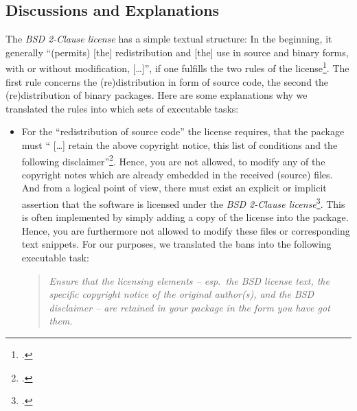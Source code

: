 \subsection{Discussions and Explanations}

The \textit{BSD 2-Clause license} has a simple textual structure: In the
beginning, it generally \enquote{(permits) [the] redistribution and [the] use in
source and binary forms, with or without modification, [\ldots]}, if one
fulfills the two rules of the license\footcite[cf.][\nopage
wp]{BsdLicense2Clause}. The first rule concerns the (re)distribution in form of
source code, the second the (re)distribution of binary packages. Here are some
explanations why we translated the rules into which sets of executable tasks:

\begin{itemize}
\item For the \enquote{redistribution of source code} the license requires,
that the package must \enquote{ [\ldots] retain the above copyright notice, this
list of conditions and the following disclaimer}\footcite[cf.][\nopage
wp]{BsdLicense2Clause}. Hence, you are not allowed, to modify any of the
copyright notes which are already embedded in the received (source) files. And
from a logical point of view, there must exist an explicit or implicit
assertion that the software is licensed under the \textit{BSD 2-Clause
license}\footcite[The BSD license requires that a re-distributed software
package must contain the (package specific) copyright notice, the (license
specific) conditions and the BSD disclaimer. (cf.][\nopage wp.) You might ask
what you should do, if these elements are missed in the package you got. If so,
the package you got had not been licensed adequately. Hence, you do not know
reliably whether you have received it under a BSD license. In other words: If
you have received a BSD licensed software package, it must contain sufficient
license fulfilling elements, or it is not a BSD licensed
software]{BsdLicense2Clause}. This is often implemented by simply adding a copy
of the license into the package. Hence, you are furthermore not allowed to
modify these files or corresponding text snippets. For our purposes, we
translated the bans into the following executable task:

\begin{quote}\textit{Ensure that the licensing elements -- esp.\ the BSD license
text, the specific copyright notice of the original author(s), and the BSD disclaimer
-- are retained in your package in the form you have got them.}\end{quote}


\end{itemize}
